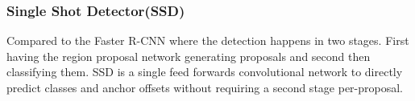 \subsubsection{Single Shot Detector(SSD)}
Compared to the Faster R-CNN where the detection happens in two stages. First having the region proposal network generating proposals and
second then classifying them. SSD is a single feed forwards convolutional network to directly predict classes and anchor offsets
without requiring a second stage per-proposal.

     
